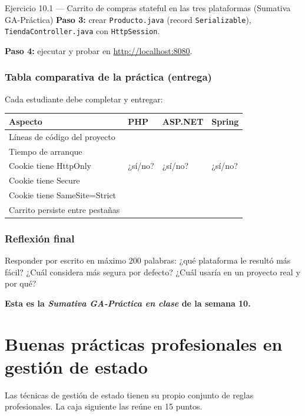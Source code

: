 \begin{cajaejercicio}{Ejercicio 10.1 --- Carrito de compras stateful en las tres plataformas (Sumativa GA-Práctica)}
\textbf{Paso 3:} crear \texttt{Producto.java} (record \texttt{Serializable}),
\texttt{TiendaController.java} con \texttt{HttpSession}.

\textbf{Paso 4:} ejecutar y probar en
\url{http://localhost:8080}.

\subsubsection*{Tabla comparativa de la práctica (entrega)}

Cada estudiante debe completar y entregar:

\begin{tabularx}{\textwidth}{lXXX}
\toprule
\textbf{Aspecto} & \textbf{PHP} & \textbf{ASP.NET} & \textbf{Spring}\\
\midrule
Líneas de código del proyecto & & & \\
Tiempo de arranque & & & \\
Cookie tiene HttpOnly & ¿sí/no? & ¿sí/no? & ¿sí/no?\\
Cookie tiene Secure & & & \\
Cookie tiene SameSite=Strict & & & \\
Carrito persiste entre pestañas & & & \\
\bottomrule
\end{tabularx}

\subsubsection*{Reflexión final}

Responder por escrito en máximo 200 palabras: ¿qué plataforma le
resultó más fácil? ¿Cuál considera más segura por defecto? ¿Cuál usaría
en un proyecto real y por qué?

\textbf{Esta es la \emph{Sumativa GA-Práctica en clase} de la semana
10.}
\end{cajaejercicio}

\section{Buenas prácticas profesionales en gestión de estado}

Las técnicas de gestión de estado tienen su propio conjunto
de reglas profesionales. La caja siguiente las reúne en 15 puntos.


